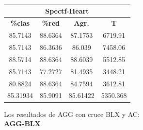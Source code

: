 \documentclass[11pt,a4paper]{article}
\theoremstyle{definition}
\begin{document}
\begin{tabbing}
{		\begin{tabular}{|c|c|c|c|}
			\hline
			\multicolumn{4}{|c|}{\textbf{Spectf-Heart}} \\ \hline
			\textbf{\%clas} & \textbf{\%red} & \textbf{Agr.} & \textbf{T} \\ \hline 
			85.7143	 & 88.6364	&87.1753	 & 6719.91 \\ \hline
85.7143	&  86.3636&	86.039	 & 7458.06 \\ \hline
88.5714	 & 88.6364	&88.6039	 & 5512.85 \\ \hline
85.7143	 & 77.2727	&81.4935	 & 3448.21 \\ \hline
80.8824	 & 88.6364	&84.7594	 & 3612.81 \\ \hline
85.31934&	85.9091	&85.61422	&5350.368 \\ \hline
		\end{tabular}
		}
	\end{tabbing}
	
		Los resultados de AGG con cruce BLX y AC: ~\\
	
	\textbf{AGG-BLX}
	
\end{document}
